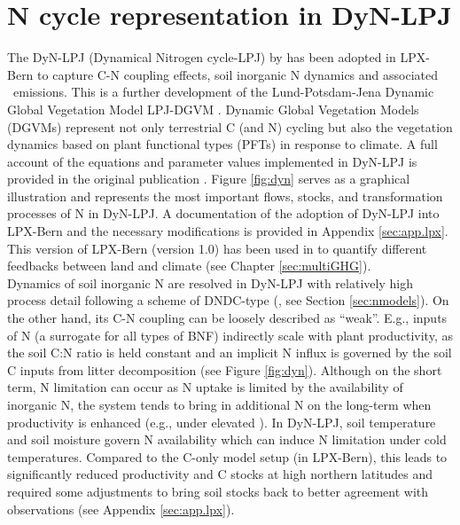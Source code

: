 \section{N cycle representation in DyN-LPJ}
\label{sec:dyn}
The DyN-LPJ (Dynamical Nitrogen cycle-LPJ) by \citet{xuri08gcb} has been adopted in LPX-Bern to capture C-N coupling effects, soil inorganic N dynamics and associated \nno\ emissions. This is a further development of the Lund-Potsdam-Jena Dynamic Global Vegetation Model LPJ-DGVM \citep{sitch03gcb}. Dynamic Global Vegetation Models (DGVMs) represent not only terrestrial C (and N) cycling but also the vegetation dynamics based on plant functional types (PFTs) in response to climate. A full account of the equations and parameter values implemented in DyN-LPJ is provided in the original publication \citep{xuri08gcb}. Figure \ref{fig:dyn} serves as a graphical illustration and represents the most important flows, stocks, and transformation processes of N in DyN-LPJ. A documentation of the adoption of DyN-LPJ into LPX-Bern and the necessary modifications is provided in Appendix \ref{sec:app.lpx}. This version of LPX-Bern (version 1.0) has been used in \citet{stocker13natcc} to quantify different feedbacks between land and climate (see Chapter \ref{sec:multiGHG}).\\ 
 
Dynamics of soil inorganic N are resolved in DyN-LPJ with relatively high process detail following a scheme of DNDC-type (\citet{li00}, see Section \ref{sec:nmodels}). On the other hand, its C-N coupling can be loosely described as ``weak''. E.g., inputs of N (a surrogate for all types of BNF) indirectly scale with plant productivity, as the soil C:N ratio is held constant and an implicit N influx is governed by the soil C inputs from litter decomposition  (see Figure \ref{fig:dyn}). Although on the short term, N limitation can occur as N uptake is limited by the availability of inorganic N, the system tends to bring in additional N on the long-term when productivity is enhanced (e.g., under elevated \coo ). In DyN-LPJ, soil temperature and soil moisture govern N availability which can induce N limitation under cold temperatures. Compared to the C-only model setup (in LPX-Bern), this leads to significantly reduced productivity and C stocks at high northern latitudes and required some adjustments to bring soil stocks back to better agreement with observations (see Appendix \ref{sec:app.lpx}).\\

